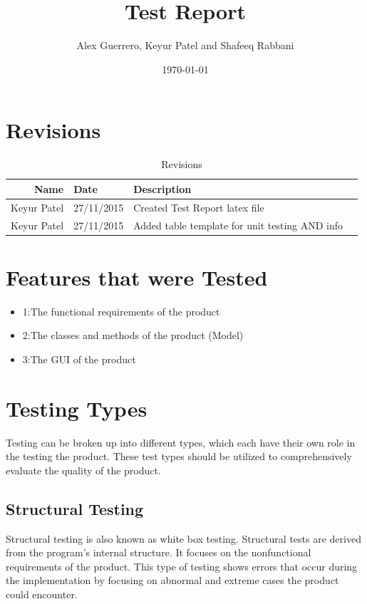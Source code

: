 \documentclass[12pt]{article}
\begin{document}
\title{Test Report} 
\author{Alex Guerrero, Keyur Patel and Shafeeq Rabbani}
\date{\today}

\maketitle

\section{Revisions}
\begin{center}
	\begin{longtable}{ | r | p{4cm} | p{4cm} | p{4cm} |}
	\caption{Revisions} \\ \hline \label{TblInputVar} 
	Name & Date & Description\\ \hline
	Keyur Patel & 27/11/2015 &  Created Test Report latex file\\ \hline
	Keyur Patel & 27/11/2015 &  Added table template for unit testing AND info\\ \hline
	\end{longtable}
\end{center}

\tableofcontents
\newpage



\section{Features that were Tested}

\begin{itemize}
\item 1:The functional requirements of the product
\item 2:The classes and methods of the product (Model)
\item 3:The GUI of the product
\end{itemize}

\section{Testing Types}
Testing can be broken up into different types, which each have their own role in the testing the product. These test types should be utilized to comprehensively evaluate the quality of the product.
\subsection{Structural Testing}
Structural testing  is also known as white box testing. Structural tests are derived from the program's internal structure. It focuses on the nonfunctional requirements of the product. This type of testing shows errors that occur during the implementation by focusing on abnormal and extreme cases the product could encounter.
\end{document}
